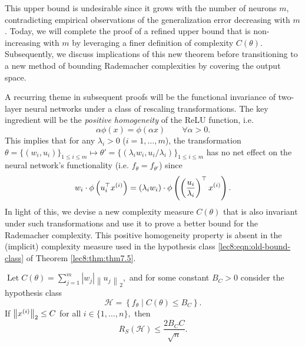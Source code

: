 This upper bound is undesirable since it grows with the number of neurons $m$, contradicting empirical observations of the generalization error decreasing with $m$. Today, we will complete the proof of a refined upper bound that is non-increasing with $m$ by leveraging a finer definition of complexity $C(\theta)$. Subsequently, we discuss implications of this new theorem before transitioning to a new method of bounding Rademacher complexities by covering the output space.



A recurring theme in subsequent proofs will be the functional invariance of two-layer neural networks under a class of rescaling transformations. The key ingredient will be the \textit{positive homogeneity} of the ReLU function, i.e.
\begin{equation}
\alpha \phi(x) = \phi(\alpha x) \qquad \forall \alpha > 0.
\end{equation}
This implies that for any $\lambda_i > 0$ ($i = 1, \dots, m$), the transformation $\theta = \{(w_i, u_i)\}_{1 \leq i \leq m} \mapsto \theta' = \{(\lambda_i w_i,  u_i / \lambda_i )\}_{1 \leq i \leq m}$ has no net effect on the neural network's functionality (i.e. $f_{\theta} = f_{\theta'}$) since 
\begin{equation}
w_i\cdot \phi \left(u_i^\top x\sp i \right) = (\lambda_i w_i) \cdot \phi\l(\l( \frac{u_i}{\lambda_i}\r)^\top x\sp i\r).   
\end{equation}
In light of this, we devise a new complexity measure $C(\theta)$ that is also invariant under such transformations and use it to prove a better bound for the Rademacher complexity. This positive homogeneity property is absent in the (implicit) complexity measure used in the hypothesis class \eqref{lec8:eqn:old-bound-class} of Theorem \ref{lec8:thm:thm7.5}. 

\begin{theorem}\label{lec8:thm:thm-improved-nn-rc}
$\operatorname{Let} C(\theta)=\sum_{j=1}^{m}\left|w_{j}\right|\left\|u_{j}\right\|_{2},$ and for some constant $B_{C}>0$ consider the hypothesis class
\begin{equation}
\mathcal{H}=\left\{f_{\theta} \mid C(\theta) \leq B_{C}\right\}.
\end{equation}
If $\left\|x\sp{i}\right\|_{2} \leq C$ for all $i \in\{1, \ldots, n\},$ then
\begin{equation}
R_{S}(\mathcal{H}) \leq \frac{2 B_{C} C}{\sqrt{n}}.
\end{equation}
\end{theorem}

